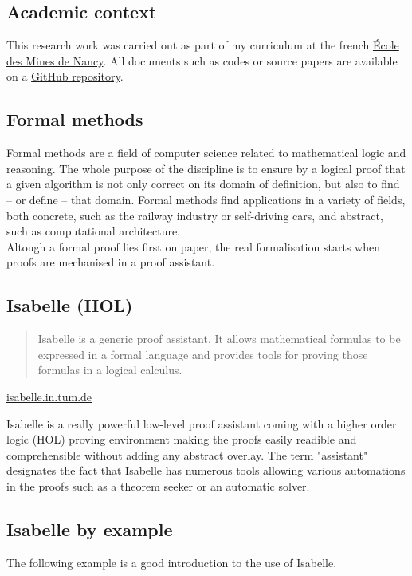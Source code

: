 \documentclass[a4 paper, 12pt]{article}
\theoremstyle{definition}
\begin{document}
\subsection{Academic context}
This research work was carried out as part of my curriculum at the french \href{https://mines-nancy.univ-lorraine.fr}{École des Mines de Nancy}. All documents such as codes or source papers are available on a \href{https://github.com/VTrelat/Tarjan}{GitHub repository}.

\subsection{Formal methods}
Formal methods are a field of computer science related to mathematical logic and reasoning. The whole purpose of the discipline is to ensure by a logical proof that a given algorithm is not only correct on its domain of definition, but also to find -- or define -- that domain. Formal methods find applications in a variety of fields, both concrete, such as the railway industry or self-driving cars, and abstract, such as computational architecture.\\
Altough a formal proof lies first on paper, the real formalisation starts when proofs are mechanised in a proof assistant.

\subsection{Isabelle (HOL)}
\begin{quote}
    Isabelle is a generic proof assistant. It allows mathematical formulas to be expressed in a formal language and provides tools for proving those formulas in a logical calculus.
\end{quote}
\begin{flushright}
    \href{https://isabelle.in.tum.de/}{isabelle.in.tum.de}
\end{flushright}
Isabelle is a really powerful low-level proof assistant coming with a higher order logic (HOL) proving environment making the proofs easily readible and comprehensible without adding any abstract overlay. The term "assistant" designates the fact that Isabelle has numerous tools allowing various automations in the proofs such as a theorem seeker or an automatic solver.

\subsection{Isabelle by example}
The following example is a good introduction to the use of Isabelle.
\end{document}

